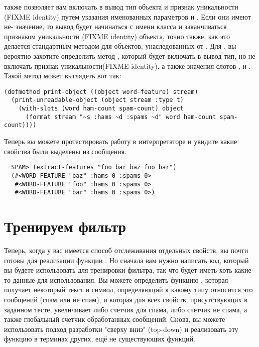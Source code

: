  также позволяет вам включать в вывод тип объекта и признак
уникальности (FIXME identity) путём указания именованных параметров  и
.  Если они имеют не- значение, то вывод будет начинаться с имени
класса и заканчиваться признаком уникальности (FIXME identity) объекта, точно также, как
это делается стандартным методом  для объектов, унаследованных от
.  Для , вы вероятно захотите определить метод
, который будет включать в вывод тип, но не включать признак
уникальности(FIXME identity), а также значения слотов ,  и
.  Такой метод может выглядеть вот так:

\begin{lstlisting}
(defmethod print-object ((object word-feature) stream)
  (print-unreadable-object (object stream :type t)
    (with-slots (word ham-count spam-count) object
      (format stream "~s :hams ~d :spams ~d" word ham-count spam-count))))
\end{lstlisting}

Теперь вы можете протестировать работу  в интерпретаторе и увидите
какие свойства были выделены из сообщения.

\begin{verbatim}
  SPAM> (extract-features "foo bar baz foo bar")
  (#<WORD-FEATURE "baz" :hams 0 :spams 0>
   #<WORD-FEATURE "foo" :hams 0 :spams 0>
   #<WORD-FEATURE "bar" :hams 0 :spams 0>)
\end{verbatim}

\section{Тренируем фильтр}

Теперь, когда у вас имеется способ отслеживания отдельных свойств, вы почти готовы для
реализации функции .  Но сначала вам нужно написать код, который вы будете
использовать для тренировки фильтра, так что  будет иметь хоть какие-то данные
для использования.  Вы можете определить функцию , которая получает некоторый
текст и символ, определяющий к какому типу относится это сообщений (спам или не спам), и
которая для всех свойств, присутствующих в заданном тесте, увеличивает либо счетчик для
спама, либо счетчик не спама, а также глобальный счетчик обработанных сообщений.  Снова,
вы можете использовать подход разработки "сверху вниз" (top-down) и реализовать эту
функцию в терминах других, ещё не существующих функций.

